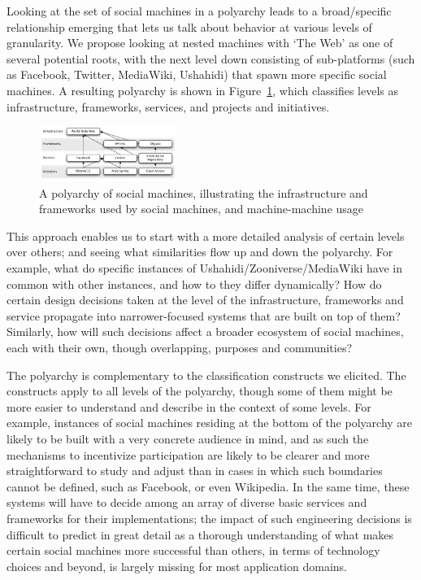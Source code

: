 \documentclass{sig-alternate}
\begin{document}
Looking at the set of social machines in a polyarchy leads to a broad/specific relationship emerging that lets us talk about behavior at various levels of granularity. We propose looking at nested machines with `The Web' as one of several potential roots, with the next level down consisting of sub-platforms (such as Facebook, Twitter, MediaWiki, Ushahidi) that spawn more specific social machines. A resulting polyarchy is shown in Figure~\ref{polyarchy}, which classifies levels as infrastructure, frameworks, services, and projects and initiatives.

\begin{figure}[htb]
\begin{center}
\includegraphics[width=0.4\textwidth]{img/polyarchy.pdf}
\caption{A polyarchy of social machines, illustrating the infrastructure and frameworks used by social machines, and machine-machine usage} \label{polyarchy}
\end{center}
\end{figure}

This approach enables us to start with a more detailed analysis of certain levels over others;
and seeing what similarities flow up and down the polyarchy. For example, what do
specific instances of Ushahidi/Zooniverse/MediaWiki have in common with other instances, and
how to they differ dynamically? How do certain design decisions taken at the level of the infrastructure, frameworks and service propagate into narrower-focused systems that are built on top of them? Similarly, how will such decisions affect a broader ecosystem of social machines, each with their own, though overlapping, purposes and communities?

The polyarchy is complementary to the classification constructs we elicited. The constructs apply to all levels of the polyarchy, though some of them might be more easier to understand and describe in the context of some levels. For example, instances of social machines residing at the bottom of the polyarchy are likely to be built with a very concrete audience in mind, and as such the mechanisms to incentivize participation are likely to be clearer and more straightforward to study and adjust than in cases in which such boundaries cannot be defined, such as Facebook, or even Wikipedia. In the same time, these systems will have to decide among an array of diverse basic services and frameworks for their implementations; the impact of such engineering decisions is difficult to predict in great detail as a thorough understanding of what makes certain social machines more successful than others, in terms of technology choices and beyond, is largely missing for most application domains.
\end{document}
